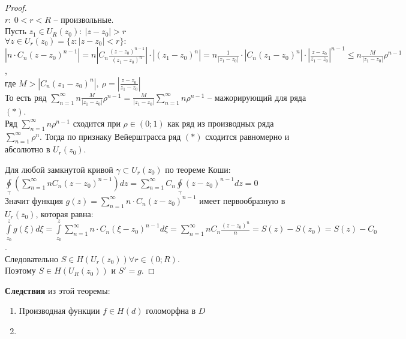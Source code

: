 \begin{proof}
    \ \\
    $r: \ 0<r<R$ -- произвольные.\\
    Пусть $z_1 \in U_R(z_0): \ |z-z_0| > r$\\
    $\forall z \in U_r(z_0) = \{z: |z-z_0|<r\}:$\\
    $|n\cdot C_n(z-z_0)^{n-1}| = n\left|C_n\frac{(z-z_0)^{n-1}}{(z_1-z_0)^n}\right|\cdot |(z_1-z_0)^n|=n\frac{1}{|z_1-z_0|}\cdot |C_n (z_1-z_0)^n|\cdot \left|\frac{z-z_0}{z_1-z_0}\right|^{n-1}\leq n\frac{M}{|z_1-z_0|}\rho^{n-1}$,\\
    где $M > |C_n (z_1-z_0)^n|, \ \rho = \left|\frac{z-z_0}{z_1-z_0}\right|$\\
    То есть ряд $\sum_{n=1}^\infty n\frac{M}{|z_1-z_0|}\rho^{n-1}=\frac{M}{|z_1-z_0|}\sum_{n=1}^\infty n\rho^{n-1}$ -- мажорирующий для ряда $(*)$.\\
    Ряд $\sum_{n=1}^\infty n\rho^{n-1}$ сходится при $\rho \in (0; 1)$ как ряд из производных ряда $\sum_{n=1}^\infty\rho^n$. Тогда по признаку Вейерштрасса ряд $(*)$ сходится равномерно и абсолютно в $U_r(z_0)$.

    Для любой замкнутой кривой $\gamma \subset U_r(z_0)$ по теореме Коши:\\
    $\oint\limits_{\gamma}\left( \sum_{n=1}^\infty n C_n (z-z_0)^{n-1} \right)dz=\sum_{n=1}^\infty C_n \oint\limits_{\gamma}(z-z_0)^{n-1}dz=0$\\
    Значит функция $g(z)=\sum_{n=1}^\infty n\cdot C_n(z-z_0)^{n-1}$ имеет первообразную в $U_r(z_0)$, которая равна:\\
    $\int\limits_{z_0}^z g(\xi)d\xi = \int\limits_{z_0}^z\sum_{n=1}^{\infty} n\cdot C_n (\xi-z_0)^{n-1}d\xi=\sum_{n=1}^{\infty} n C_n \frac{(z-z_0)^n}{n} = S(z)-S(z_0) = S(z)-C_0$.\\
    Следовательно $S \in H(U_r(z_0)) \forall r \in (0; R)$.\\
    Поэтому $S \in H(U_R(z_0))$ и $S'=g$.
\end{proof}

\textbf{Следствия} из этой теоремы:
\begin{enumerate}
    \item Производная функции $f\in H(d)$ голоморфна в $D$
    \item 
\end{enumerate}